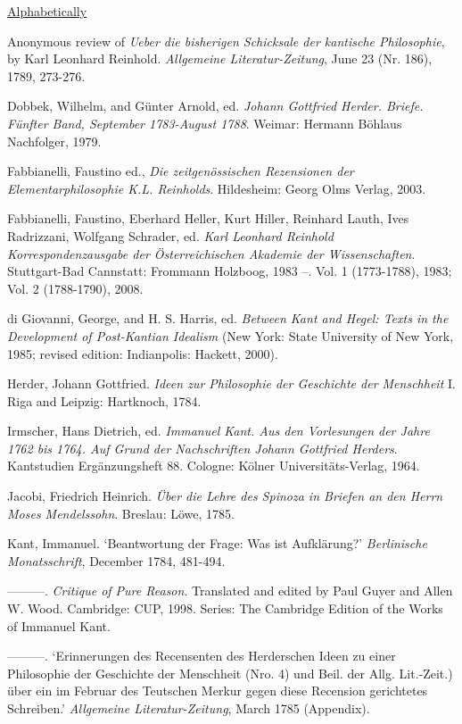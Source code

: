 \ul{Alphabetically }

Anonymous review of \textit{Ueber die bisherigen Schicksale der kantische Philosophie}, by Karl Leonhard Reinhold. \textit{Allgemeine Literatur{-}Zeitung}, June 23 (Nr. 186), 1789, 273{-}276.

Dobbek, Wilhelm, and G\"{u}nter Arnold, ed. \textit{Johann Gottfried Herder. Briefe. F\"{u}nfter Band, September 1783{-}August 1788}. Weimar: Hermann B\"{o}hlaus Nachfolger, 1979.

Fabbianelli, Faustino ed., \textit{Die zeitgen\"{o}ssischen Rezensionen der Elementarphilosophie K.L. Reinholds}. Hildesheim: Georg Olms Verlag, 2003.

Fabbianelli, Faustino, Eberhard Heller, Kurt Hiller, Reinhard Lauth, Ives Radrizzani, Wolfgang Schrader, ed. \textit{Karl Leonhard Reinhold Korrespondenzausgabe der \"{O}sterreichischen Akademie der Wissenschaften}. Stuttgart{-}Bad Cannstatt: Frommann Holzboog, 1983 {--}. Vol. 1 (1773{-}1788), 1983; Vol. 2 (1788{-}1790), 2008.

di Giovanni, George, and H. S. Harris, ed. \textit{Between Kant and Hegel: Texts in the Development of Post{-}Kantian Idealism} (New York: State University of New York, 1985; revised edition: Indianpolis: Hackett, 2000).

Herder, Johann Gottfried. \textit{Ideen zur Philosophie der Geschichte der Menschheit} I. Riga and Leipzig: Hartknoch, 1784. 

Irmscher, Hans Dietrich, ed. \textit{Immanuel Kant. Aus den Vorlesungen der Jahre 1762 bis 1764. Auf Grund der Nachschriften Johann Gottfried Herders}. Kantstudien Erg\"{a}nzungsheft 88. Cologne: K\"{o}lner Universit\"{a}ts{-}Verlag, 1964. 

Jacobi, Friedrich Heinrich. \textit{\"{U}ber die Lehre des Spinoza in Briefen an den Herrn Moses Mendelssohn}. Breslau: L\"{o}we, 1785.

Kant, Immanuel. `Beantwortung der Frage: Was ist Aufkl\"{a}rung?' \textit{Berlinische Monatsschrift}, December 1784, 481{-}494.

{---}{---}{---}. \textit{Critique of Pure Reason}. Translated and edited by Paul Guyer and Allen W. Wood. Cambridge: CUP, 1998. Series: The Cambridge Edition of the Works of Immanuel Kant. 

{---}{---}{---}. `Erinnerungen des Recensenten des Herderschen Ideen zu einer Philosophie der Geschichte der Menschheit (Nro. 4) und Beil. der Allg. Lit.{-}Zeit.) \"{u}ber ein im Februar des Teutschen Merkur gegen diese Recension gerichtetes Schreiben.' \textit{Allgemeine Literatur{-}Zeitung}, March 1785 (Appendix). 

